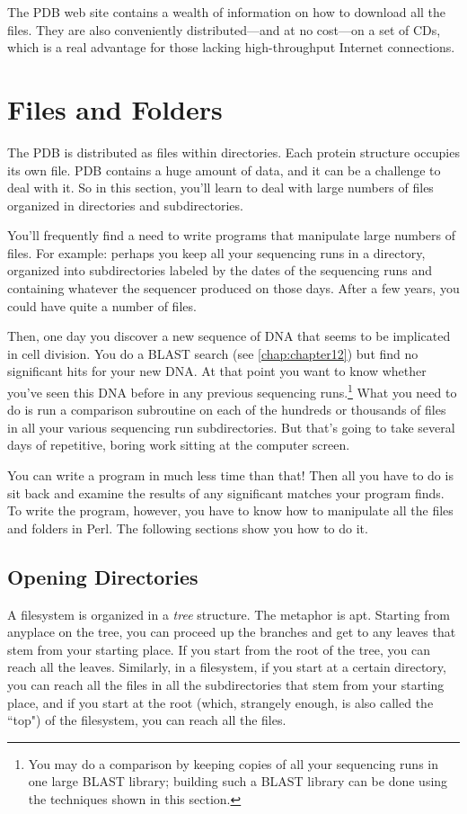 The PDB web site contains a wealth of information on how to download all the files. They are also conveniently distributed—and at no cost—on a set of CDs, which is a real advantage for those lacking high-throughput Internet connections. 

\section{Files and Folders}
The PDB is distributed as files within directories. Each protein structure occupies its own file. PDB contains a huge amount of data, and it can be a challenge to deal with it. So in this section, you'll learn to deal with large numbers of files organized in directories and subdirectories.

You'll frequently find a need to write programs that manipulate large numbers of files. For example: perhaps you keep all your sequencing runs in a directory, organized into subdirectories labeled by the dates of the sequencing runs and containing whatever the sequencer produced on those days. After a few years, you could have quite a number of files.

Then, one day you discover a new sequence of DNA that seems to be implicated in cell division. You do a BLAST search (see \autoref{chap:chapter12}) but find no significant hits for your new DNA. At that point you want to know whether you've seen this DNA before in any previous sequencing runs.\footnote{You may do a comparison by keeping copies of all your sequencing runs in one large BLAST library; building such a BLAST library can be done using the techniques shown in this section.} What you need to do is run a comparison subroutine on each of the hundreds or thousands of files in all your various sequencing run subdirectories. But that's going to take several days of repetitive, boring work sitting at the computer screen.

You can write a program in much less time than that! Then all you have to do is sit back and examine the results of any significant matches your program finds. To write the program, however, you have to know how to manipulate all the files and folders in Perl. The following sections show you how to do it. 

\subsection{Opening Directories}
A filesystem is organized in a \textit{tree} structure. The metaphor is apt. Starting from anyplace on the tree, you can proceed up the branches and get to any leaves that stem from your starting place. If you start from the root of the tree, you can reach all the leaves. Similarly, in a filesystem, if you start at a certain directory, you can reach all the files in all the subdirectories that stem from your starting place, and if you start at the root (which, strangely enough, is also called the ``top") of the filesystem, you can reach all the files.

